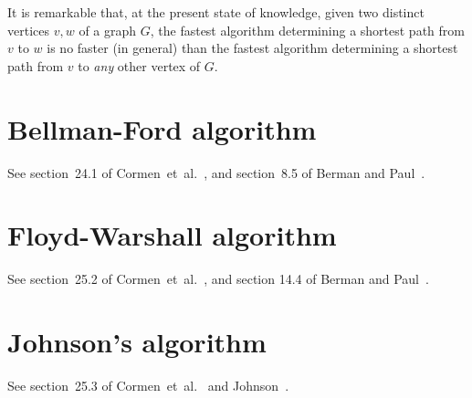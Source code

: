 It is remarkable that, at the present state of knowledge, 
given two distinct vertices $v,w$ of a graph $G$, the
fastest algorithm determining a shortest path from $v$ to $w$ is 
no faster (in general) than the fastest algorithm determining a
shortest path from $v$ to {\it any} other vertex of $G$.




\section{Bellman-Ford algorithm}

See section~24.1 of Cormen~et~al.~\cite{CormenEtAl2001}, and
section~8.5 of Berman and Paul~\cite{BermanPaul1997}.



\section{Floyd-Warshall algorithm}

See section~25.2 of Cormen~et~al.~\cite{CormenEtAl2001}, and section
14.4 of Berman and Paul~\cite{BermanPaul1997}.



\section{Johnson's algorithm}

See section~25.3 of Cormen~et~al.~\cite{CormenEtAl2001} and
Johnson~\cite{Johnson1977}.
